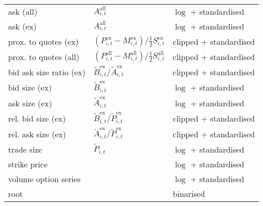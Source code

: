 \begin{table}[H]
\begin{threeparttable}
\begin{tabular}{@{}lll@{}}
            ask (all)               & $A_{i, t}^{\text{all}}$                                                                          & $\log$ + standardised  \\
            ask (ex)                & $A_{i, t}^{\text{all}}$                                                                          & $\log$ + standardised  \\
            prox. to quotes (ex)    & $\left(P_{i, t}^{\text{ex}}- M_{i, t}^{\text{ex}}\right) / \tfrac{1}{2} S_{i, t}^{\text{ex}}$    & clipped + standardised \\
            prox. to quotes (all)   & $\left(P_{i, t}^{\text{all}}- M_{i, t}^{\text{all}}\right) / \tfrac{1}{2} S_{i, t}^{\text{all}}$ & clipped + standardised \\
            bid ask size ratio (ex) & $\tilde{B}_{i, t}^{\text{ex}}/\tilde{A}_{i, t}^{\text{ex}}$                                      & clipped + standardised \\
            bid size (ex)           & $\tilde{B}_{i, t}^{\text{ex}}$                                                                   & $\log$ + standardised  \\
            ask size (ex)           & $\tilde{A}_{i, t}^{\text{ex}}$                                                                   & $\log$ + standardised  \\
            rel. bid size (ex)      & $\tilde{B}_{i, t}^{\text{ex}}/\tilde{P}_{i, t}^{\text{ex}}$                                      & clipped + standardised \\
            rel. ask size (ex)      & $\tilde{A}_{i, t}^{\text{ex}}/\tilde{P}_{i, t}^{\text{ex}}$                                      & clipped + standardised \\
            trade size              & $\tilde{P}_{i, t}$                                                                               & $\log$ + standardised  \\
            strike price            &                                                                                                  & $\log$ + standardised  \\
            volume option series    &                                                                                                  & $\log$ + standardised  \\
            root                    &                                                                                                  & binarised              \\

\end{tabular}
\end{threeparttable}
\end{table}
